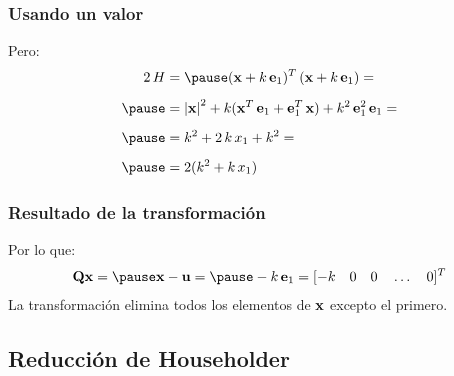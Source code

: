\documentclass[12pt]{beamer}
\begin{document}
\begin{frame}
\frametitle{Usando un valor}
Pero:
\pause
\begin{eqnarray*}
\begin{aligned}
2 \, H &= \pause (\vb{x} + k \, \vb{e}_{1})^{T} \, (\vb{x} + k \, \vb{e}_{1}) = \\[0.5em] \pause
&= \abs{\vb{x}}^{2} + k (\vb{x}^{T} \, \vb{e}_{1} + \vb{e}_{1}^{T} \, \vb{x}) + k^{2} \, \vb{e}_{1}^{2} \, \vb{e}_{1} = \\[0.5em] \pause
&= k^{2} + 2 \, k \, x_{1} + k^{2} = \\[0.5em] \pause
&= 2 (k^{2} + k \, x_{1})
\end{aligned}
\end{eqnarray*}
\end{frame}
\begin{frame}
\frametitle{Resultado de la transformación}
Por lo que:
\pause
\begin{eqnarray}
\begin{aligned}
\vb{Q x} = \pause \vb{x} - \vb{u} = \pause -k \, \vb{e}_{1} = [ -k \quad 0 \quad 0 \quad \ldots \quad 0]^{T}
\label{eq:ecuacion_09_39}
\end{aligned}
\end{eqnarray}
\pause
La transformación elimina todos los elementos de $\vb{x}$ excepto el primero.
\end{frame}

\subsection{Reducción de Householder}
\end{document}

